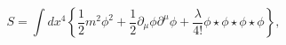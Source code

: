 \begin{equation}
S=\int dx^{4}\left\{  \frac{1}{2}m^{2}\phi^{2}+\frac{1}{2}\partial_{\mu}%
\phi\partial^{\mu}\phi+\frac{\lambda}{4!}\phi\star\phi\star\phi\star
\phi\right\},  \label{clact}%
\end{equation}

